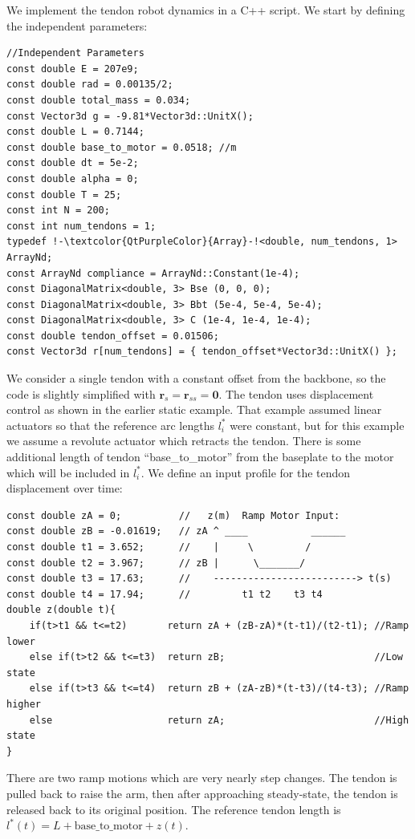 \documentclass[12pt]{article}
\begin{document}
We implement the tendon robot dynamics in a C++ script. We start by defining the independent parameters:
\begin{lstlisting}
//Independent Parameters
const double E = 207e9;
const double rad = 0.00135/2;
const double total_mass = 0.034;
const Vector3d g = -9.81*Vector3d::UnitX();
const double L = 0.7144;
const double base_to_motor = 0.0518; //m
const double dt = 5e-2;
const double alpha = 0;
const double T = 25;
const int N = 200;
const int num_tendons = 1;
typedef !-\textcolor{QtPurpleColor}{Array}-!<double, num_tendons, 1> ArrayNd;
const ArrayNd compliance = ArrayNd::Constant(1e-4);
const DiagonalMatrix<double, 3> Bse (0, 0, 0);
const DiagonalMatrix<double, 3> Bbt (5e-4, 5e-4, 5e-4);
const DiagonalMatrix<double, 3> C (1e-4, 1e-4, 1e-4);
const double tendon_offset = 0.01506;
const Vector3d r[num_tendons] = { tendon_offset*Vector3d::UnitX() };
\end{lstlisting}
We consider a single tendon with a constant offset from the backbone, so the code is slightly simplified with $\boldsymbol{r}_s = \boldsymbol{r}_{ss} = \boldsymbol{0}$. The tendon uses displacement control as shown in the earlier static example. That example assumed linear actuators so that the reference arc lengths $l_i^*$ were constant, but for this example we assume a revolute actuator which retracts the tendon. There is some additional length of tendon ``base\_to\_motor'' from the baseplate to the motor which will be included in $l_i^*$. We define an input profile for the tendon displacement over time:
\begin{lstlisting}
const double zA = 0;          //   z(m)  Ramp Motor Input:
const double zB = -0.01619;   // zA ^ ____           ______
const double t1 = 3.652;      //    |     \         /
const double t2 = 3.967;      // zB |      \_______/
const double t3 = 17.63;      //    -------------------------> t(s)
const double t4 = 17.94;      //         t1 t2    t3 t4
double z(double t){
    if(t>t1 && t<=t2)       return zA + (zB-zA)*(t-t1)/(t2-t1); //Ramp lower
    else if(t>t2 && t<=t3)  return zB;                          //Low state
    else if(t>t3 && t<=t4)  return zB + (zA-zB)*(t-t3)/(t4-t3); //Ramp higher
    else                    return zA;                          //High state
}
\end{lstlisting}
There are two ramp motions which are very nearly step changes. The tendon is pulled back to raise the arm, then after approaching steady-state, the tendon is released back to its original position. The reference tendon length is $l^*(t) = L + \text{base\_to\_motor} + z(t)$.
\end{document}
